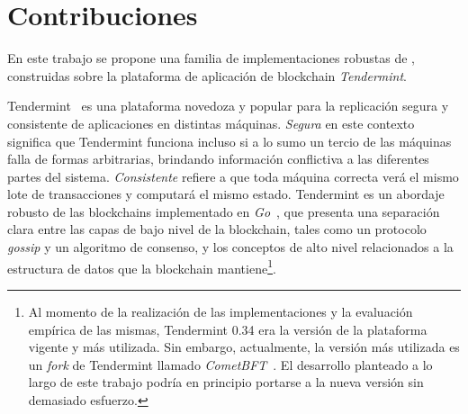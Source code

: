 \section{Contribuciones}
En este trabajo se propone una familia de implementaciones robustas de \setchain,
construidas sobre la plataforma de aplicación de blockchain \textit{Tendermint}.



Tendermint~\cite{Buchman.2018.Tendermint} es una plataforma novedoza y popular para la
replicación segura y consistente de aplicaciones en distintas máquinas.
%
\textit{Segura} en este contexto significa que Tendermint funciona incluso si a lo sumo
un tercio de las máquinas falla de formas arbitrarias, brindando información conflictiva
a las diferentes partes del sistema.
%
\textit{Consistente} refiere a que toda máquina correcta verá el mismo lote de
transacciones y computará el mismo estado.
%
Tendermint es un abordaje robusto de las blockchains implementado
en \emph{Go}~\cite{donovan15go}, que presenta una separación clara entre las
capas de bajo nivel de la blockchain,
tales como un protocolo \textit{gossip} y un algoritmo de consenso, y los conceptos de alto
nivel relacionados a la estructura de datos que la blockchain mantiene\footnote{Al momento
de la realización de las implementaciones y la evaluación empírica de las mismas,
Tendermint 0.34 era la versión de la plataforma vigente y más utilizada. Sin embargo,
actualmente, la versión más utilizada es un \textit{fork} de Tendermint llamado \textit{CometBFT}~\cite{cometbft.repo}.
El desarrollo planteado a lo largo de este trabajo podría en principio portarse a la nueva versión sin demasiado esfuerzo.}.

%
%

